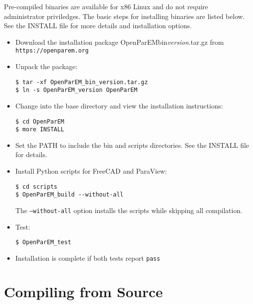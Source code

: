 \documentclass[titlepage]{article}
\renewcommand\_{\textunderscore\linebreak[1]}
\begin{document}
Pre-compiled binaries are available for x86 Linux and do not require administrator priviledges.
The basic steps for installing binaries are listed below.  See the INSTALL file for more details and installation options.
\begin{itemize}[nosep]
   \item Download the installation package OpenParEM\_bin\_\textit{version}.tar.gz from \verb+https://openparem.org+
   \item Unpack the package:
         \begin{Verbatim}
$ tar -xf OpenParEM_bin_version.tar.gz
$ ln -s OpenParEM_version OpenParEM
         \end{Verbatim}
   \item Change into the base directory and view the installation instructions:
         \begin{Verbatim}
$ cd OpenParEM
$ more INSTALL
         \end{Verbatim}
   \item Set the PATH to include the bin and scripts directories.  See the INSTALL file for details.
   \item Install Python scripts for FreeCAD and ParaView:
         \begin{Verbatim}
$ cd scripts
$ OpenParEM_build --without-all
         \end{Verbatim}
         The \texttt{--without-all} option installs the scripts while skipping all compilation.
   \item Test:
         \begin{Verbatim}
$ OpenParEM_test
         \end{Verbatim}
   \item Installation is complete if both tests report \texttt{pass}
\end{itemize}

\section{Compiling from Source}
\end{document}
